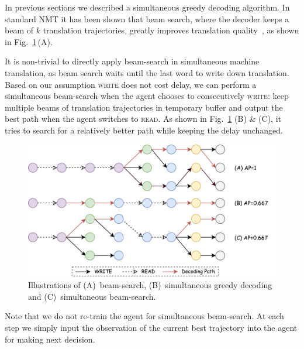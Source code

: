 In previous sections we described a simultaneous greedy decoding algorithm. In standard NMT it has been shown that beam search, where the decoder keeps a beam of $k$ translation trajectories, greatly improves translation quality~\cite{sutskever2014sequence}, as shown in Fig.~\ref{beam}\,(A). 

It is non-trivial to directly apply beam-search in simultaneous machine translation,
as beam search waits until the last word to write down translation. Based on our assumption \textsc{write} does not cost delay,
we can perform a simultaneous beam-search when the agent chooses to consecutively \textsc{write}: keep multiple beams of translation trajectories in temporary buffer and output the best path when the agent switches to \textsc{read}. As shown in Fig.~\ref{beam} (B) \& (C), it tries to search for a relatively better path while keeping the delay unchanged.

\begin{figure}[t]
   	\centering
          	
          	\includegraphics[width=\linewidth]{figs/simultrans/decoding.pdf} 
          	\caption{\label{beam} {Illustrations of (A)~beam-search, (B)~simultaneous greedy decoding and (C)~simultaneous beam-search.}} 
  
\end{figure} 

Note that we do not re-train the agent for simultaneous beam-search. At each step we simply input the observation of the current best trajectory into the agent for making next decision. %



